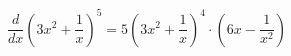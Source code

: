 \[
\frac{d}{dx}\left(3x^{2}+\frac{1}{x}\right)^{5}
= 5\left(3x^{2}+\frac{1}{x}\right)^{4}\cdot\left(6x-\frac{1}{x^{2}}\right)
\]
